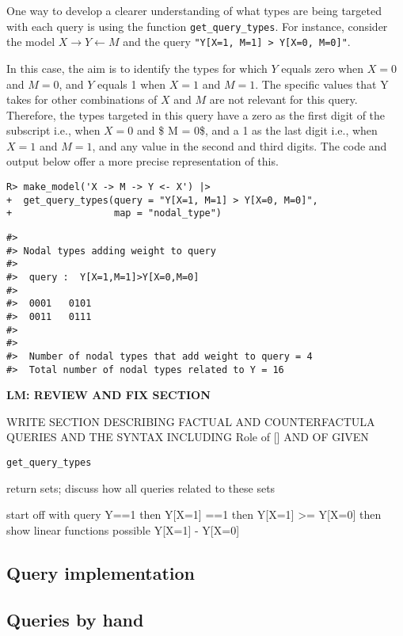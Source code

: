 \documentclass[
  11pt,
  article]{jss}
\begin{document}
One way to develop a clearer understanding of what types are being
targeted with each query is using the function
\texttt{get\_query\_types}. For instance, consider the model
\(X \rightarrow Y \leftarrow M\) and the query
\texttt{"Y{[}X=1,\ M=1{]}\ \textgreater{}\ Y{[}X=0,\ M=0{]}"}.

In this case, the aim is to identify the types for which \(Y\) equals
zero when \(X = 0\) and \(M = 0\), and \(Y\) equals 1 when \(X = 1\) and
\(M = 1\). The specific values that Y takes for other combinations of
\(X\) and \(M\) are not relevant for this query. Therefore, the types
targeted in this query have a zero as the first digit of the subscript
i.e., when \(X = 0\) and \$ M = 0\$, and a 1 as the last digit i.e.,
when \(X = 1\) and \(M = 1\), and any value in the second and third
digits. The code and output below offer a more precise representation of
this.

\begin{verbatim}
R> make_model('X -> M -> Y <- X') |> 
+  get_query_types(query = "Y[X=1, M=1] > Y[X=0, M=0]", 
+                  map = "nodal_type")
\end{verbatim}

\begin{verbatim}
#> 
#> Nodal types adding weight to query
#> 
#>  query :  Y[X=1,M=1]>Y[X=0,M=0] 
#> 
#>  0001   0101
#>  0011   0111
#> 
#> 
#>  Number of nodal types that add weight to query = 4
#>  Total number of nodal types related to Y = 16
\end{verbatim}

\textbf{LM: REVIEW AND FIX SECTION}

WRITE SECTION DESCRIBING FACTUAL AND COUNTERFACTULA QUERIES AND THE
SYNTAX INCLUDING Role of {[}{]} AND OF GIVEN

\texttt{get\_query\_types}

return sets; discuss how all queries related to these sets

start off with query Y==1 then Y{[}X=1{]} ==1 then Y{[}X=1{]}
\textgreater= Y{[}X=0{]} then show linear functions possible Y{[}X=1{]}
- Y{[}X=0{]}

\hypertarget{query-implementation}{%
\subsection{Query implementation}\label{query-implementation}}

\hypertarget{queries-by-hand}{%
\subsection{Queries by hand}\label{queries-by-hand}}
\end{document}
